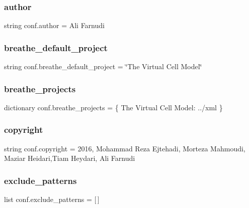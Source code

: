 \subsubsection{\texorpdfstring{author}{author}}
{\footnotesize\ttfamily string conf.\+author = \textquotesingle{}Ali Farnudi\textquotesingle{}}

\mbox{\label{namespaceconf_a6eba2d2c7ae923054b1c49e686ec89b9}} 
\subsubsection{\texorpdfstring{breathe\_default\_project}{breathe\_default\_project}}
{\footnotesize\ttfamily string conf.\+breathe\+\_\+default\+\_\+project = \char`\"{}The Virtual Cell Model\char`\"{}}

\mbox{\label{namespaceconf_acb47d2c0c2904fa7d36b63142533f383}} 
\subsubsection{\texorpdfstring{breathe\_projects}{breathe\_projects}}
{\footnotesize\ttfamily dictionary conf.\+breathe\+\_\+projects = \{ \textquotesingle{}The Virtual Cell Model\textquotesingle{}\+: \textquotesingle{}../xml\textquotesingle{} \}}

\mbox{\label{namespaceconf_a33fa97cf51dcb25970fbf53f10159589}} 
\subsubsection{\texorpdfstring{copyright}{copyright}}
{\footnotesize\ttfamily string conf.\+copyright = \textquotesingle{}2016, Mohammad Reza Ejtehadi, Morteza Mahmoudi, Maziar Heidari,Tiam Heydari, Ali Farnudi\textquotesingle{}}

\mbox{\label{namespaceconf_a7ad48fb6f3e9b129c02346ea0d3527c1}} 
\subsubsection{\texorpdfstring{exclude\_patterns}{exclude\_patterns}}
{\footnotesize\ttfamily list conf.\+exclude\+\_\+patterns = \mbox{[}$\,$\mbox{]}}

